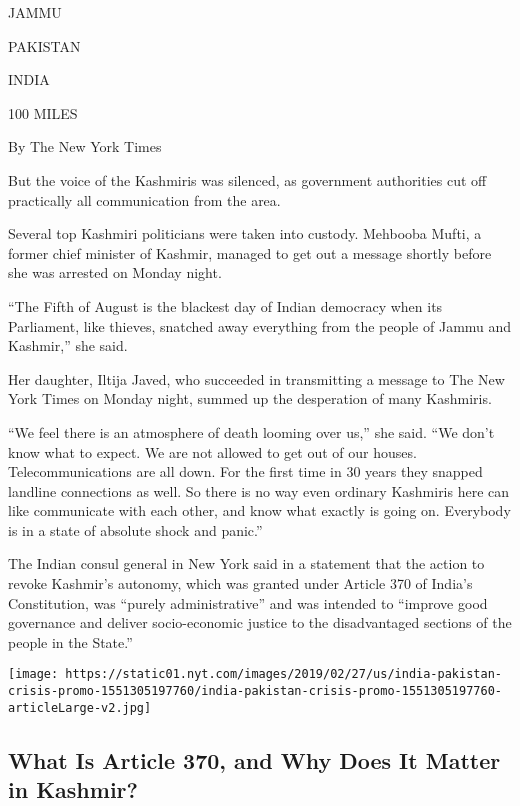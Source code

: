 JAMMU

PAKISTAN

INDIA

100 MILES

By The New York Times

But the voice of the Kashmiris was silenced, as government authorities
cut off practically all communication from the area.

Several top Kashmiri politicians were taken into custody. Mehbooba
Mufti, a former chief minister of Kashmir, managed to get out a message
shortly before she was arrested on Monday night.

``The Fifth of August is the blackest day of Indian democracy when its
Parliament, like thieves, snatched away everything from the people of
Jammu and Kashmir,'' she said.

Her daughter, Iltija Javed, who succeeded in transmitting a message to
The New York Times on Monday night, summed up the desperation of many
Kashmiris.

``We feel there is an atmosphere of death looming over us,'' she said.
``We don't know what to expect. We are not allowed to get out of our
houses. Telecommunications are all down. For the first time in 30 years
they snapped landline connections as well. So there is no way even
ordinary Kashmiris here can like communicate with each other, and know
what exactly is going on. Everybody is in a state of absolute shock and
panic.''

The Indian consul general in New York said in a statement that the
action to revoke Kashmir's autonomy, which was granted under Article 370
of India's Constitution, was ``purely administrative'' and was intended
to ``improve good governance and deliver socio-economic justice to the
disadvantaged sections of the people in the State.''

\href{https://www.nytimes.com/interactive/2019/world/asia/india-pakistan-crisis.html}{}

\texttt{[image: https://static01.nyt.com/images/2019/02/27/us/india-pakistan-crisis-promo-1551305197760/india-pakistan-crisis-promo-1551305197760-articleLarge-v2.jpg]}

\hypertarget{what-is-article-370-and-why-does-it-matter-in-kashmir}{%
\subsection{What Is Article 370, and Why Does It Matter in
Kashmir?}\label{what-is-article-370-and-why-does-it-matter-in-kashmir}}

